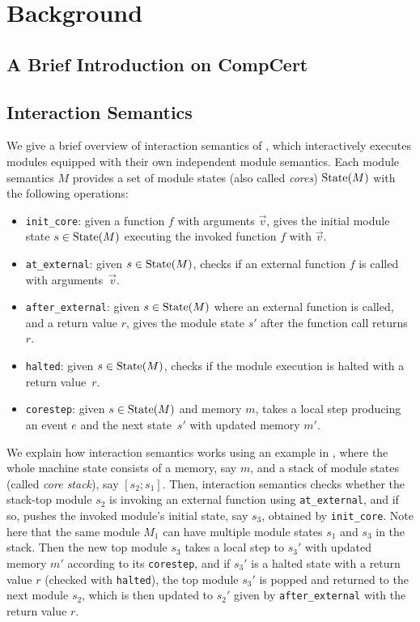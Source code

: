 \section{Background}
\label{sec:compiler:background}

\subsection{A Brief Introduction on CompCert}



\subsection{Interaction Semantics}

We give a brief overview of interaction semantics of \ccc{}, which
interactively executes modules equipped with their own independent
module semantics. Each module semantics $M$ provides
a set of module states (also called \emph{cores}) $\textrm{State}(M)$ with the following operations:
\begin{itemize}
\item \texttt{init\_core}: given a function $f$ with arguments $\vec{v}$,
  gives the initial module state $s \in \textrm{State}(M)$
  executing the invoked function $f$ with $\vec{v}$.
\item \texttt{at\_external}: given $s \in \textrm{State}(M)$,
  checks if an external function $f$ is called with arguments~$\vec{v}$.
\item \texttt{after\_external}: given $s \in \textrm{State}(M)$
  where an external function is called,
  and a return value $r$,
  gives the module state $s'$
  after the function call returns $r$.
\item \texttt{halted}: given $s \in \textrm{State}(M)$, checks if the module execution is halted with a return value~$r$.
\item \texttt{corestep}: given $s \in \textrm{State}(M)$ and memory $m$, takes a local step producing an event $e$ and the next state~$s'$ with updated memory $m'$.
\end{itemize}

We explain how interaction semantics works using an example in
, where the whole machine state consists of a
memory, say $m$, and a stack of module states (called \emph{core stack}), say $[s_2; s_1]$.
Then, interaction semantics checks whether the stack-top module $s_2$
is invoking an external function using \texttt{at\_external}, and if
so, pushes the invoked module's initial state, say $s_3$, obtained by
\texttt{init\_core}. Note here that the same module $M_1$ can have
multiple module states $s_1$ and $s_3$ in the stack.  Then the
new top module $s_3$ takes a local step to $s_3'$ with updated memory
$m'$ according to its \texttt{corestep}, and if $s_3'$ is a halted
state with a return value $r$ (checked with \texttt{halted}), the top
module $s_3'$ is popped and returned to the next module $s_2$, which
is then updated to $s_2'$ given by \texttt{after\_external} with the return
value $r$.

